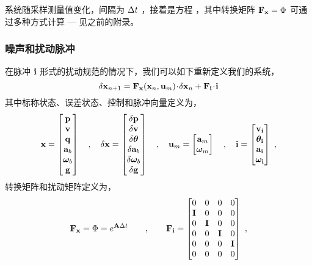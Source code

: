 系统随采样测量值变化，间隔为 $\Delta t$ ，接着是方程 ，其中转换矩阵 ${\bf F}_{\bf x}=\Phi$ 可通过多种方式计算 --- 见之前的附录。 

\subsubsection{噪声和扰动脉冲}


在脉冲 ${\bf i}$ 形式的扰动规范的情况下，我们可以如下重新定义我们的系统，
%
\begin{equation}
\delta{\bf x}_{n+1} = {\bf F}_{\bf x}({\bf x}_n, {\bf u}_m)\!\cdot\! \delta{\bf x}_n+{\bf F}_{\bf i}\!\cdot\!{\bf i}
\end{equation}
%
其中标称状态、误差状态、控制和脉冲向量定义为，
%
\begin{equation}
{\bf x}=\begin{bmatrix}{\bf p}\\{\bf v}\\{\bf q}\\{\bf a}_b\\{\bm \omega}_b\\{\bf g}\end{bmatrix} \quad, \quad
\delta{\bf x}=\begin{bmatrix}\delta{\bf p}\\\delta{\bf v}\\\delta{\bm \theta}\\\delta{\bf a}_b\\\delta{\bm \omega}_b\\\delta{\bf g}\end{bmatrix} \quad, \quad
{\bf u}_m = \begin{bmatrix}
{\bf a}_m \\
{\bm \omega}_m
\end{bmatrix} 
\quad,  \quad
{\bf i} = \begin{bmatrix}
{\bf v}_{\bf i} \\
{\bm \theta}_{\bf i} \\
{\bf a}_{\bf i} \\
{\bm \omega}_{\bf i}
\end{bmatrix}~,
\end{equation}
%
转换矩阵和扰动矩阵定义为，
%
\begin{equation}
{\bf F}_{\bf x} = \Phi = e^{{\bf A}\Delta t}
\qquad,\qquad
{\bf F}_{\bf i} 
= \begin{bmatrix}
 0 &  0 & 0 & 0 \\
 {\bf I} &  0 & 0 & 0 \\
 0 &  {\bf I} & 0 & 0 \\
 0 &  0 & {\bf I} & 0 \\
 0 & 0 & 0 & {\bf I} \\
 0 &  0 & 0 & 0 
\end{bmatrix} ~,
\end{equation}

